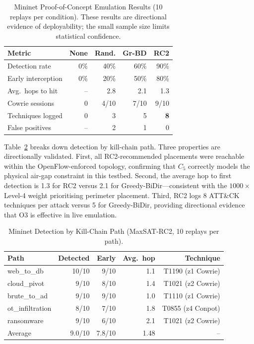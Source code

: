 \documentclass[journal]{IEEEtran}
\begin{document}
\begin{table}[t]
\caption{Mininet Proof-of-Concept Emulation Results
  (10 replays per condition). These results are directional evidence
  of deployability; the small sample size limits statistical
  confidence.}
\label{tab:emulation}
\centering
\renewcommand{\arraystretch}{1.2}
\begin{tabular}{p{3.0cm}rrrr}
\toprule
Metric & None & Rand. & Gr-BD & RC2 \\
\midrule
Detection rate     & 0\%  & 40\%  & 60\%  & 90\% \\
Early interception & 0\%  & 20\%  & 50\%  & 80\% \\
Avg.\ hops to hit  & --   & 2.8   & 2.1   & 1.3  \\
Cowrie sessions    & 0    & 4/10  & 7/10  & 9/10 \\
Techniques logged  & 0    & 3     & 5     & \textbf{8}    \\
False positives    & --   & 2     & 1     & 0    \\
\bottomrule
\end{tabular}
\end{table}

Table~\ref{tab:emulation_paths} breaks down detection by kill-chain
path. Three properties are directionally validated. First, all
RC2-recommended placements were reachable within the
OpenFlow-enforced topology, confirming that $C_5$ correctly models
the physical air-gap constraint in this testbed. Second, the average
hop to first detection is 1.3 for RC2 versus 2.1 for
Greedy-BiDir---consistent with the $1000\times$ Level-4 weight
prioritising perimeter placement. Third, RC2 logs 8 ATT\&CK
techniques per attack versus 5 for Greedy-BiDir, providing
directional evidence that O3 is effective in live emulation.

\begin{table}[t]
\caption{Mininet Detection by Kill-Chain Path (MaxSAT-RC2,
  10 replays per path).}
\label{tab:emulation_paths}
\centering
\renewcommand{\arraystretch}{1.2}
\begin{tabular}{lrrrr}
\toprule
Path & Detected & Early & Avg.\ hop & Technique \\
\midrule
web\_to\_db      & 10/10 & 9/10 & 1.1 & T1190 (z1 Cowrie) \\
cloud\_pivot     & 9/10  & 8/10 & 1.4 & T1021 (z2 Cowrie) \\
brute\_to\_ad    & 9/10  & 9/10 & 1.0 & T1110 (z1 Cowrie) \\
ot\_infiltration & 8/10  & 7/10 & 1.8 & T0855 (z4 Conpot) \\
ransomware       & 9/10  & 6/10 & 2.1 & T1021 (z2 Cowrie) \\
\midrule
Average & 9.0/10 & 7.8/10 & 1.48 & -- \\
\bottomrule
\end{tabular}
\end{table}
\end{document}
